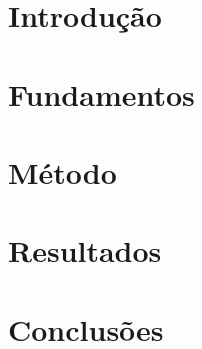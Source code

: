 \documentclass[mestrado, pre-defesa, english, brazil]{packages/icmc}
\begin{document}
\textual

\chapter{Introdução}
\label{chapter:introducao}


\chapter{Fundamentos}
\label{chapter:fundamentos}


\chapter{Método}
\label{chapter:metodo}


\chapter{Resultados}
\label{chapter:resultados}


\chapter{Conclusões}
\label{chapter:conclusões}


%

\postextual





\glsaddall
\printglossaries

\end{document}
